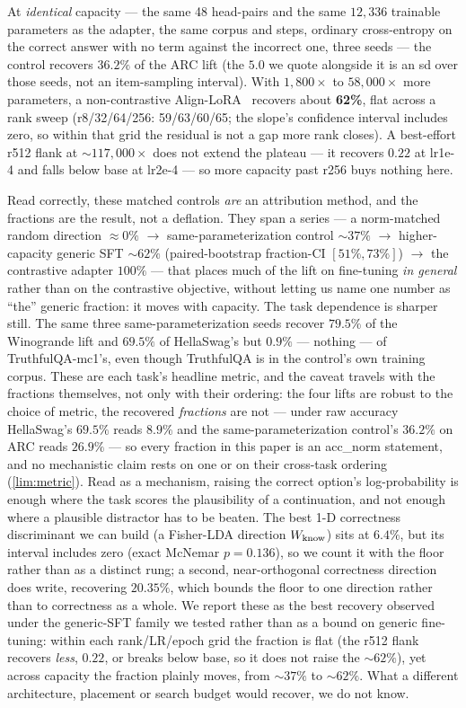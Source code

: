 At \emph{identical} capacity --- the same 48 head-pairs and the same $12{,}336$
trainable parameters as the adapter, the same corpus and steps, ordinary
cross-entropy on the correct answer with no term against the incorrect one, three
seeds --- the control recovers $\mathbf{36.2\%}$ of the ARC lift (the $5.0$ we
quote alongside it is an sd over those seeds, not an item-sampling interval). With
$1{,}800\times$ to $58{,}000\times$ more parameters, a non-contrastive Align-LoRA~\citep{LoRA}
recovers about \textbf{62\%}, flat across a rank sweep (r8/32/64/256: 59/63/60/65;
the slope's confidence interval includes zero, so within that grid the residual is
not a gap more rank closes). A best-effort r512 flank at ${\sim}117{,}000\times$ does
not extend the plateau --- it recovers $0.22$ at lr1e-4 and falls below base at
lr2e-4 --- so more capacity past r256 buys nothing here.

Read correctly, these matched controls \emph{are} an attribution method, and the
fractions are the result, not a deflation. They span a series --- a norm-matched
random direction ${\approx}0\%$ $\rightarrow$ same-parameterization control
${\sim}37\%$ $\rightarrow$ higher-capacity generic SFT ${\sim}62\%$
(paired-bootstrap fraction-CI $[51\%, 73\%]$) $\rightarrow$ the contrastive adapter $100\%$ --- that places much of
the lift on fine-tuning \emph{in general} rather than on the contrastive objective,
without letting us name one number as ``the'' generic fraction: it moves with
capacity. The task dependence is sharper still. The same three same-parameterization
seeds recover $79.5\%$ of the Winogrande lift and $69.5\%$ of HellaSwag's but
$0.9\%$ --- nothing --- of TruthfulQA-mc1's, even though TruthfulQA is in the
control's own training corpus. These are each task's headline metric, and the caveat
travels with the fractions themselves, not only with their ordering: the four lifts
are robust to the choice of metric, the recovered \emph{fractions} are not --- under
raw accuracy HellaSwag's $69.5\%$ reads $8.9\%$ and the same-parameterization
control's $36.2\%$ on ARC reads $26.9\%$ --- so every fraction in this paper is an
acc\_norm statement, and no mechanistic claim rests on one or on their cross-task
ordering (\cref{lim:metric}). Read as a mechanism, raising the correct
option's log-probability is enough
where the task scores the plausibility of a continuation, and not enough where a
plausible distractor has to be beaten. The best 1-D correctness discriminant we can
build (a Fisher-LDA direction $W_{\mathrm{know}}$) sits at $6.4\%$,
but its interval includes zero (exact McNemar $p=0.136$), so we count it with the
floor rather than as a distinct rung; a second, near-orthogonal correctness
direction does write, recovering $20.35\%$, which bounds the floor to one direction
rather than to correctness as a whole. We report these as the best recovery observed
under the generic-SFT family we tested rather than as a bound on generic fine-tuning:
within each rank/LR/epoch grid the fraction is flat (the r512 flank recovers
\emph{less}, $0.22$, or breaks below base, so it does not raise the ${\sim}62\%$), yet
across capacity the fraction plainly moves, from ${\sim}37\%$ to ${\sim}62\%$. What a
different architecture, placement or search budget would recover, we do not know.

